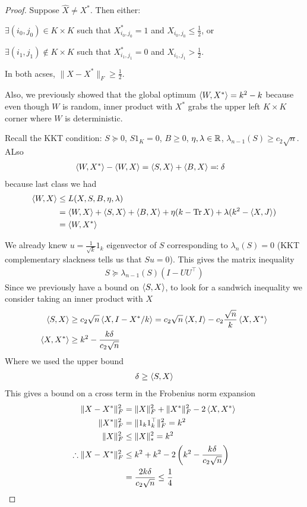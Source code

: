 \begin{proof}
  Suppose $\hat{X} \neq X^*$. Then either:

  $\exists (i_0, j_0) \in K \times K$
  such that $X_{i_0, j_0}^* = 1$ and $X_{i_0, j_0} \leq \frac{1}{2}$,
  or

  $\exists (i_1, j_1) \not\in K \times K$ such that $X_{i_1,j_1}^* = 0$
  and $X_{i_1,j_1} > \frac{1}{2}$.

  In both acses, $\|X - X^*\|_F \geq \frac{1}{2}$.

  Also, we previously showed that the global optimum $\braket{W, X^*} = k^2 - k$
  because even though $W$ is random, inner product with $X^*$ grabs the upper left
  $K \times K$ corner where $W$ is deterministic.

  Recall the KKT condition: $S \succeq 0$, $S 1_K = 0$, $B \geq 0$, $\eta, \lambda \in \mathbb{R}$,
  $\lambda_{n-1}(S) \geq c_2 \sqrt{n}$. ALso
  \begin{align}
    \braket{W, X^*} - \braket{W, X} &= \braket{S, X} + \braket{B, X} \eqqcolon \delta
  \end{align}
  because last class we had
  \begin{align}
    \braket{W, X}
    &\leq L(X, S, B, \eta, \lambda) \\
    &= \braket{W, X} + \braket{S, X} + \braket{B, X} + \eta(k - \operatorname{Tr} X) + \lambda (k^2 - \braket{X,J}) \\
    &= \braket{W, X^*}
  \end{align}

  We already knew $u = \frac{1}{\sqrt{k}} 1_k$ eigenvector of $S$ corresponding to $\lambda_n(S) = 0$
  (KKT complementary slackness tells us that $S u = 0$). This gives the matrix
  inequality
  \begin{align}
    S \succeq \lambda_{n-1}(S)(I - U U^\top)
  \end{align}
  Since we previously have a bound on $\braket{S,X}$, to look for a sandwich inequality
  we consider taking an inner product with $X$
  \begin{align}
    \braket{S, X}
    &\geq c_2 \sqrt{n} \braket{X, I - X^* / k}
    =  c_2 \sqrt{n} \braket{X, I} - c_2 \frac{\sqrt{n}}{k} \braket{X, X^*} \\
    \braket{X, X^*} &\geq k^2 - \frac{k \delta}{c_2 \sqrt{n}}
  \end{align}
  Where we used the upper bound
  \begin{align}
    \delta \geq \braket{S, X}
  \end{align}
  This gives a bound on a cross term in the Frobenius norm expansion
  \begin{align}
    \|X - X^*\|_F^2
    &= \|X\|_F^2 + \|X^*\|_F^2 - 2 \braket{X, X^*} \\
    \|X^*\|_F^2 &= \|1_k 1_k^\top\|_F^2 = k^2 \\
    \|X\|_F^2 &\leq \|X\|_\ast^2 = k^2 \\
    \therefore \|X - X^*\|_F^2
              &\leq k^2 + k^2 - 2 \left(k^2 - \frac{k \delta}{c_2 \sqrt{n}}\right) \\
              &= \frac{2 k \delta}{c_2 \sqrt{n}}
              \leq \frac{1}{4}
  \end{align}
\end{proof}

